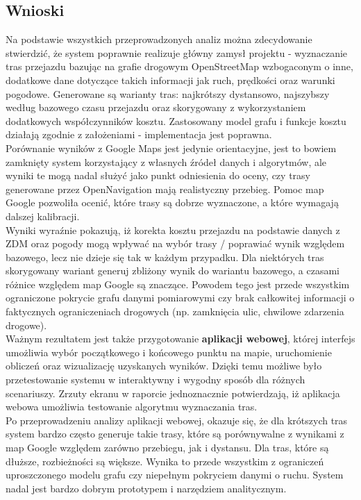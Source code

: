 \documentclass[12pt]{article}
\begin{document}
\subsection{Wnioski}

Na podstawie wszystkich przeprowadzonych analiz można zdecydowanie stwierdzić, że system poprawnie realizuje główny zamysł projektu - wyznaczanie tras przejazdu bazując na grafie drogowym OpenStreetMap wzbogaconym o inne, dodatkowe dane dotyczące takich informacji jak ruch, prędkości oraz warunki pogodowe. Generowane są warianty tras: najkrótszy dystansowo, najszybszy według bazowego czasu przejazdu oraz skorygowany z wykorzystaniem dodatkowych współczynników kosztu. Zastosowany model grafu i funkcje kosztu działają zgodnie z założeniami - implementacja jest poprawna.\\

Porównanie wyników z Google Maps jest jedynie orientacyjne, jest to bowiem zamknięty system korzystający z własnych źródeł danych i algorytmów, ale wyniki te mogą nadal służyć jako punkt odniesienia do oceny, czy trasy generowane przez OpenNavigation mają realistyczny przebieg. Pomoc map Google pozwoliła ocenić, które trasy są dobrze wyznaczone, a które wymagają dalszej kalibracji.\\

Wyniki wyraźnie pokazują, iż korekta kosztu przejazdu na podstawie danych z ZDM oraz pogody mogą wpływać na wybór trasy / poprawiać wynik względem bazowego, lecz nie dzieje się tak w każdym przypadku. Dla niektórych tras skorygowany wariant generuj zbliżony wynik do wariantu bazowego, a czasami różnice względem map Google są znaczące. Powodem tego jest przede wszystkim ograniczone pokrycie grafu danymi pomiarowymi czy brak całkowitej informacji o faktycznych ograniczeniach drogowych (np. zamknięcia ulic, chwilowe zdarzenia drogowe).\\

Ważnym rezultatem jest także przygotowanie \textbf{aplikacji webowej}, której interfejs umożliwia wybór początkowego i końcowego punktu na mapie, uruchomienie obliczeń oraz wizualizację uzyskanych wyników. Dzięki temu możliwe było przetestowanie systemu w interaktywny i wygodny sposób dla różnych scenariuszy. Zrzuty ekranu w raporcie jednoznacznie potwierdzają, iż aplikacja webowa umożliwia testowanie algorytmu wyznaczania tras.\\

Po przeprowadzeniu analizy aplikacji webowej, okazuje się, że dla krótszych tras system bardzo często generuje takie trasy, które są porównywalne z wynikami z map Google względem zarówno przebiegu, jak i dystansu. Dla tras, które są dłuższe, rozbieżności są większe. Wynika to przede wszystkim z ograniczeń uproszczonego modelu grafu czy niepełnym pokryciem danymi o ruchu. System nadal jest bardzo dobrym prototypem i narzędziem analitycznym.\\
\end{document}
